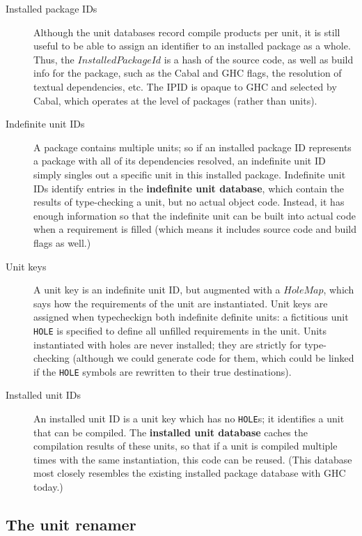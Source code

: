 \documentclass{article}
\newcommand{\I}[1]{\ensuremath{\mathit{#1}}}
\begin{document}
\begin{description} \item[Installed package IDs]  Although the unit
databases record compile products per unit, it is still useful to be
able to assign an identifier to an installed package as a whole.  Thus,
the \I{InstalledPackageId} is a hash of the source code, as well as
build info for the package, such as the Cabal and GHC flags, the
resolution of textual dependencies, etc.  The IPID is opaque to GHC
and selected by Cabal, which operates at the level of packages (rather
than units).

\item[Indefinite unit IDs]  A package contains multiple units; so if an
installed package ID represents a package with all of its dependencies
resolved, an indefinite unit ID simply singles out a specific unit in
this installed package.  Indefinite unit IDs identify entries in the
\textbf{indefinite unit database}, which contain the results of
type-checking a unit, but no actual object code. Instead, it has enough
information so that the indefinite unit can be built into actual code
when a requirement is filled (which means it includes source code and
build flags as well.)

\item[Unit keys]  A unit key is an indefinite unit ID, but augmented
with a \I{HoleMap}, which says how the requirements of the unit are
instantiated.  Unit keys are assigned when typecheckign both indefinite
definite units:  a fictitious unit \verb|HOLE| is specified to define
all unfilled requirements in the unit.  Units instantiated with holes
are never installed; they are strictly for type-checking (although
we could generate code for them, which could be linked if the
\verb|HOLE| symbols are rewritten to their true destinations).

\item[Installed unit IDs]  An installed unit ID is a unit key which has
no \verb|HOLE|s; it identifies a unit that can be compiled.  The
\textbf{installed unit database} caches the compilation results of these
units, so that if a unit is compiled multiple times with the same
instantiation, this code can be reused. (This database most closely
resembles the existing installed package database with GHC today.)
\end{description}

\subsection{The unit renamer}
\end{document}
